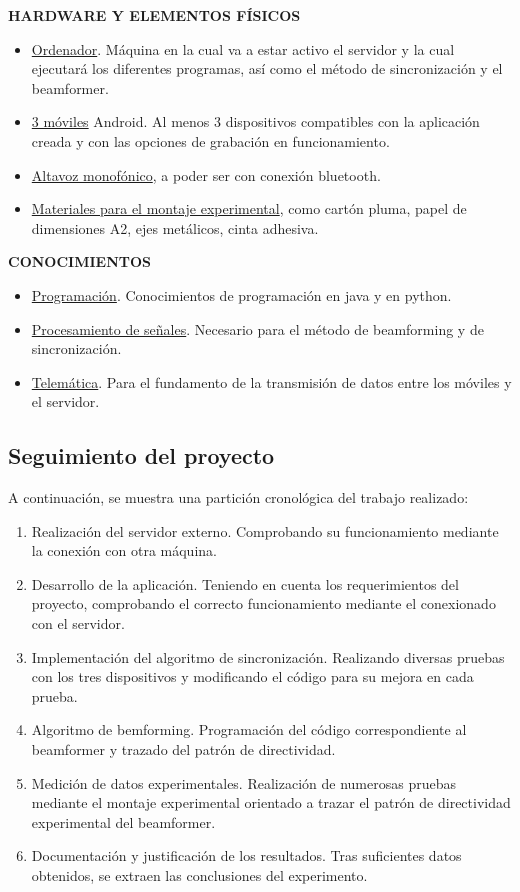 \documentclass[a4paper,11pt]{book}
\begin{document}
\textbf{HARDWARE Y ELEMENTOS FÍSICOS}	
\begin{itemize}
\item \underline{Ordenador}. Máquina en la cual va a estar activo el servidor y la cual ejecutará los diferentes programas, así como el método de sincronización y el beamformer.
\item \underline{3 móviles} Android. Al menos 3 dispositivos compatibles con la aplicación creada y con las opciones de grabación en funcionamiento. 
\item \underline{Altavoz monofónico}, a poder ser con conexión bluetooth.
\item \underline{Materiales para el montaje experimental}, como cartón pluma, papel de dimensiones A2, ejes metálicos, cinta adhesiva.
\end{itemize}
\vspace{0.5cm}

\textbf{CONOCIMIENTOS}
		\begin{itemize}
		\item \underline{Programación}. Conocimientos de programación en java y en python.
		\item \underline{Procesamiento de señales}. Necesario para el método de beamforming y de sincronización.
		\item \underline{Telemática}. Para el fundamento de la transmisión de datos entre los móviles y el servidor.
		\end{itemize}
		
		
		\subsection{Seguimiento del proyecto}
A continuación, se muestra una partición cronológica del trabajo realizado:
\begin{enumerate}
\item Realización del servidor externo. Comprobando su funcionamiento mediante la conexión con otra máquina.
\item Desarrollo de la aplicación. Teniendo en cuenta los requerimientos del proyecto, comprobando el correcto funcionamiento mediante el conexionado con el servidor.
\item Implementación del algoritmo de sincronización. Realizando diversas pruebas con los tres dispositivos y modificando el código para su mejora en cada prueba.
\item Algoritmo de bemforming. Programación del código correspondiente al beamformer y trazado del patrón de directividad.
\item Medición de datos experimentales. Realización de numerosas pruebas mediante el montaje experimental orientado a trazar el patrón de directividad experimental del beamformer. 
\item Documentación y justificación de los resultados. Tras suficientes datos obtenidos, se extraen las conclusiones del experimento. 
\end{enumerate}
\end{document}
